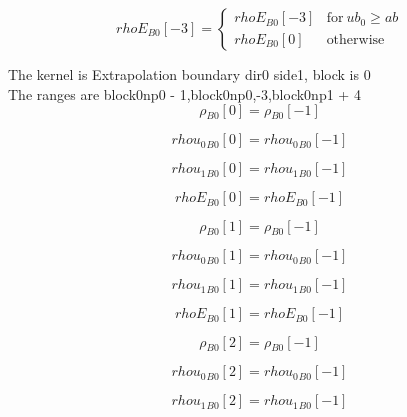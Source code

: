 \documentclass{article}
\begin{document}
\begin{dmath}{rhoE{_{B0}}}[{-3}] = \begin{cases} {rhoE{_{B0}}}[{-3}] & \text{for}\: ub_{0} \geq ab \\{rhoE{_{B0}}}[{0}] & \text{otherwise} \end{cases}\end{dmath}

\noindent The kernel is Extrapolation boundary dir0 side1, block is 0\\\noindent The ranges are block0np0 - 1,block0np0,-3,block0np1 + 4\\\begin{dmath}{\rho{_{B0}}}[{0}] = {\rho{_{B0}}}[{-1}]\end{dmath}

\begin{dmath}{rhou_{0}{_{B0}}}[{0}] = {rhou_{0}{_{B0}}}[{-1}]\end{dmath}

\begin{dmath}{rhou_{1}{_{B0}}}[{0}] = {rhou_{1}{_{B0}}}[{-1}]\end{dmath}

\begin{dmath}{rhoE{_{B0}}}[{0}] = {rhoE{_{B0}}}[{-1}]\end{dmath}

\begin{dmath}{\rho{_{B0}}}[{1}] = {\rho{_{B0}}}[{-1}]\end{dmath}

\begin{dmath}{rhou_{0}{_{B0}}}[{1}] = {rhou_{0}{_{B0}}}[{-1}]\end{dmath}

\begin{dmath}{rhou_{1}{_{B0}}}[{1}] = {rhou_{1}{_{B0}}}[{-1}]\end{dmath}

\begin{dmath}{rhoE{_{B0}}}[{1}] = {rhoE{_{B0}}}[{-1}]\end{dmath}

\begin{dmath}{\rho{_{B0}}}[{2}] = {\rho{_{B0}}}[{-1}]\end{dmath}

\begin{dmath}{rhou_{0}{_{B0}}}[{2}] = {rhou_{0}{_{B0}}}[{-1}]\end{dmath}

\begin{dmath}{rhou_{1}{_{B0}}}[{2}] = {rhou_{1}{_{B0}}}[{-1}]\end{dmath}
\end{document}

